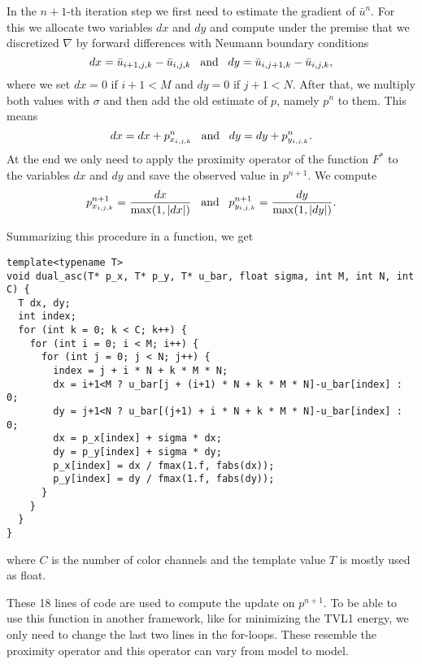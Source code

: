             In the $n+1$-th iteration step we first need to estimate the gradient of $\bar{u}^{n}$. For this we allocate two variables $dx$ and $dy$ and compute under the premise that we discretized $\nabla$ by forward differences with Neumann boundary conditions
                $$
                    dx = \bar{u}_{i+1,j,k} - \bar{u}_{i,j,k} \,\,\,\,\, \textnormal{and} \,\,\,\,\, dy = \bar{u}_{i,j+1,k} - \bar{u}_{i,j,k},
                $$
            where we set $dx = 0$ if $i + 1 < M$ and $dy = 0$ if $j + 1 < N$.
            After that, we multiply both values with $\sigma$ and then add the old estimate of $p$, namely $p^{n}$ to them. This means
                $$
                    dx = dx + p_{x_{i,j,k}}^{n} \,\,\,\,\, \textnormal{and} \,\,\,\,\, dy = dy + p_{y_{i,j,k}}^{n}.
                $$
            At the end we only need to apply the proximity operator of the function $F^{\ast}$ to the variables $dx$ and $dy$ and save the observed value in $p^{n+1}$. We compute
                $$
                    p_{x_{i,j,k}}^{n+1} = \frac{dx}{\max(1, |dx|)} \,\,\,\,\, \textnormal{and} \,\,\,\,\, p_{y_{i,j,k}}^{n+1} = \frac{dy}{\max(1, |dy|)}.
                $$
            \begin{algorithm}
            \label{alg:dual_ascent}
                Summarizing this procedure in a function, we get
                \begin{lstlisting}
template<typename T>
void dual_asc(T* p_x, T* p_y, T* u_bar, float sigma, int M, int N, int C) {
  T dx, dy;
  int index;
  for (int k = 0; k < C; k++) {
    for (int i = 0; i < M; i++) {
      for (int j = 0; j < N; j++) {
        index = j + i * N + k * M * N;
        dx = i+1<M ? u_bar[j + (i+1) * N + k * M * N]-u_bar[index] : 0;
        dy = j+1<N ? u_bar[(j+1) + i * N + k * M * N]-u_bar[index] : 0;
        dx = p_x[index] + sigma * dx;
        dy = p_y[index] + sigma * dy;
        p_x[index] = dx / fmax(1.f, fabs(dx));
        p_y[index] = dy / fmax(1.f, fabs(dy));
      }
    }
  }
}
                \end{lstlisting}
                where $C$ is the number of color channels and the template value $T$ is mostly used as float.
            \end{algorithm}

        These 18 lines of code are used to compute the update on $p^{n+1}$. To be able to use this function in another framework, like for minimizing the TVL1 energy, we only need to change the last two lines in the for-loops. These resemble the proximity operator and this operator can vary from model to model.\\

